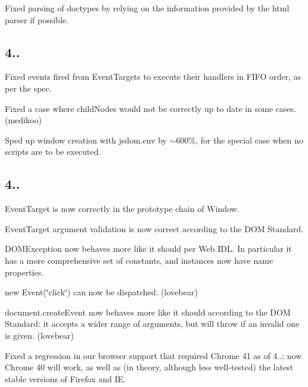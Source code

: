\begin{DoxyItemize}
\item Fixed parsing of doctypes by relying on the information provided by the html parser if possible.
\end{DoxyItemize}

\subsection*{4..}


\begin{DoxyItemize}
\item Fixed events fired from {\ttfamily Event\+Target}s to execute their handlers in F\+I\+FO order, as per the spec.
\item Fixed a case where {\ttfamily child\+Nodes} would not be correctly up to date in some cases. (medikoo)
\item Sped up window creation with {\ttfamily jsdom.\+env} by $\sim$600\%, for the special case when no scripts are to be executed.
\end{DoxyItemize}

\subsection*{4..}


\begin{DoxyItemize}
\item {\ttfamily Event\+Target} is now correctly in the prototype chain of {\ttfamily Window}.
\item {\ttfamily Event\+Target} argument validation is now correct according to the D\+OM Standard.
\item {\ttfamily D\+O\+M\+Exception} now behaves more like it should per Web I\+DL. In particular it has a more comprehensive set of constants, and instances now have {\ttfamily name} properties.
\item {\ttfamily new Event(\char`\"{}click\char`\"{})} can now be dispatched. (lovebear)
\item {\ttfamily document.\+create\+Event} now behaves more like it should according to the D\+OM Standard\+: it accepts a wider range of arguments, but will throw if an invalid one is given. (lovebear)
\item Fixed a regression in our browser support that required Chrome 41 as of 4..; now Chrome 40 will work, as well as (in theory, although less well-\/tested) the latest stable versions of Firefox and IE.
\end{DoxyItemize}

